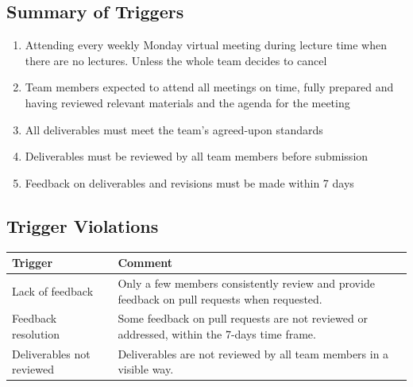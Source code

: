 \documentclass{article}
\begin{document}
\subsection{Summary of Triggers}
\begin{enumerate}
\item{Attending every weekly Monday virtual meeting during lecture time when there are no lectures. Unless the whole team decides to cancel}
\item{Team members expected to attend all meetings on time, fully prepared and having reviewed relevant materials and the agenda for the meeting}
\item{All deliverables must meet the team's agreed-upon standards}
\item{Deliverables must be reviewed by all team members before submission}
\item{Feedback on deliverables and revisions must be made within 7 days}
\end{enumerate}

\subsection{Trigger Violations}
\begin{table}[H]
\centering
\begin{tabular}{p{3cm} p{10cm}}
\toprule
\textbf{Trigger} & \textbf{Comment}\\
\midrule
Lack of feedback & Only a few members consistently review and provide feedback on pull requests when requested.\\
Feedback resolution & Some feedback on pull requests are not reviewed or addressed, within the 7-days time frame.\\
Deliverables not reviewed & Deliverables are not reviewed by all team members in a visible way.\\
\bottomrule
\end{tabular}
\end{table}
\end{document}
